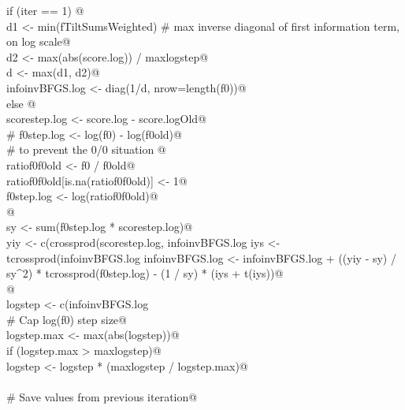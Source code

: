 \documentclass[reqno]{amsart}
\begin{document}
\begin{flushleft}
\begin{list}{}{}
\mbox{}\verb@        if (iter == 1) {@\\
\mbox{}\verb@            d1 <- min(fTiltSumsWeighted)  # max inverse diagonal of first information term, on log scale@\\
\mbox{}\verb@            d2 <- max(abs(score.log)) / maxlogstep@\\
\mbox{}\verb@            d <- max(d1, d2)@\\
\mbox{}\verb@            infoinvBFGS.log <- diag(1/d, nrow=length(f0))@\\
\mbox{}\verb@        } else {@\\
\mbox{}\verb@            scorestep.log <- score.log - score.logOld@\\
\mbox{}\verb@           # f0step.log <- log(f0) - log(f0old)@\\
\mbox{}\verb@            # to prevent the 0/0 situation @\\
\mbox{}\verb@            ratiof0f0old <- f0 / f0old@\\
\mbox{}\verb@            ratiof0f0old[is.na(ratiof0f0old)] <- 1@\\
\mbox{}\verb@            f0step.log <- log(ratiof0f0old)@\\
\mbox{}\verb@            @\\
\mbox{}\verb@            sy <- sum(f0step.log * scorestep.log)@\\
\mbox{}\verb@            yiy <- c(crossprod(scorestep.log, infoinvBFGS.log %*% scorestep.log))@\\
\mbox{}\verb@            iys <- tcrossprod(infoinvBFGS.log %*% scorestep.log, f0step.log)@\\
\mbox{}\verb@            infoinvBFGS.log <- infoinvBFGS.log + ((yiy - sy) / sy^2) * tcrossprod(f0step.log) - (1 / sy) * (iys + t(iys))@\\
\mbox{}\verb@        }@\\
\mbox{}\verb@        logstep <- c(infoinvBFGS.log %*% score.log)@\\
\mbox{}\verb@@\\
\mbox{}\verb@        # Cap log(f0) step size@\\
\mbox{}\verb@        logstep.max <- max(abs(logstep))@\\
\mbox{}\verb@        if (logstep.max > maxlogstep)@\\
\mbox{}\verb@            logstep <- logstep * (maxlogstep / logstep.max)@\\
\mbox{}\verb@@\\
\mbox{}\verb@        # Save values from previous iteration@\\

\end{list}
\end{flushleft}
\end{document}
